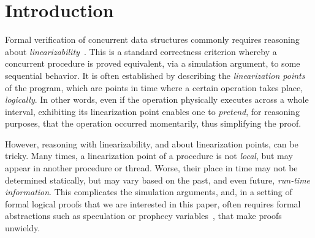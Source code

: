 \section{Introduction}
\label{sc:intro} 
   
Formal verification of concurrent data structures commonly requires
reasoning about \emph{linearizability}~\cite{Herlihy-Wing:TOPLAS90}. This
is a standard correctness criterion whereby a concurrent procedure is
proved equivalent, via a simulation argument, to some sequential
behavior. It is often established by describing the
\emph{linearization points} of the program, which are points in time
where a certain operation takes place, \emph{logically}.  In other
words, even if the operation physically executes across a whole
interval, exhibiting its linearization point enables one to
\emph{pretend}, for reasoning purposes, that the operation occurred
momentarily, thus simplifying the proof.


However, reasoning with linearizability, and about linearization
points, can be tricky. Many times, a linearization point of a
procedure is not \emph{local}, but may appear in another procedure or
thread. Worse, their place in time may not be determined statically,
but may vary based on the past, and even future, \emph{run-time
  information}. This complicates the simulation arguments, and, in a
setting of formal logical proofs that we are interested in this paper,
often requires formal abstractions such as speculation or prophecy
variables~\cite{Abadi-Lamport:LICS88}, that make proofs unwieldy.

